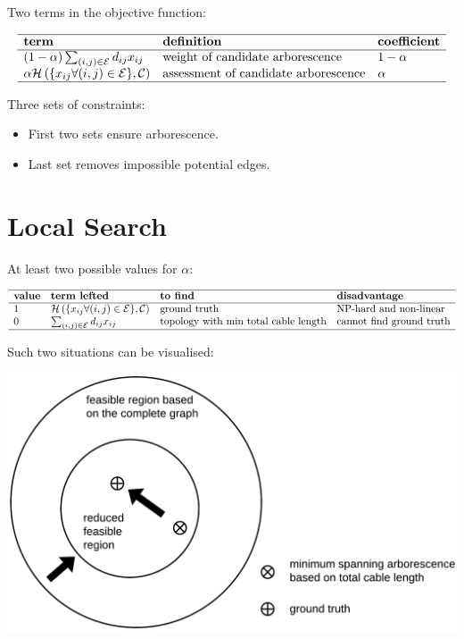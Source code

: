 \documentclass[
]{book}
\providecommand{\tightlist}{%
  \setlength{\itemsep}{0pt}\setlength{\parskip}{0pt}}
\begin{document}
Two terms in the objective function:

\[
\begin{array}{lll}
  \hline
  \textbf{term} & \textbf{definition} & \textbf{coefficient} \\
  \hline
  (1 - \alpha) \sum_{(i, j) \in \mathcal{E}} d_{i j} x_{i j}
  & \text{weight of candidate arborescence}
  & 1 - \alpha \\
  \alpha \mathcal{H}
  \left(\{x_{i j} \forall (i, j) \in \mathcal{E} \}, \mathcal{C} \right)
  & \text{assessment of candidate arborescence}
  & \alpha \\
  \hline
\end{array}
\]

Three sets of constraints:

\begin{itemize}
\tightlist
\item
  First two sets ensure arborescence. \citep{fischetti1997branch}
\item
  Last set removes impossible potential edges.
\end{itemize}

\hypertarget{combinatorial}{%
\section{Local Search}\label{combinatorial}}

At least two possible values for \(\alpha\):

\[
\begin{array}{llll}
  \hline
  \textbf{value} & \textbf{term lefted} & \textbf{to find}
  & \textbf{disadvantage} \\
  \hline
  1
  & \mathcal{H}
  \left(\{x_{i j} \forall (i, j) \in \mathcal{E} \}, \mathcal{C} \right)
  & \text{ground truth}
  & \text{NP-hard and non-linear} \\
  0
  & \sum_{(i, j) \in \mathcal{E}} d_{i j} x_{i j}
  & \text{topology with min total cable length}
  & \text{cannot find ground truth} \\
  \hline
\end{array}
\]

Such two situations can be visualised:

\begin{center}\includegraphics[width=0.7\linewidth]{Pictures/figFeasibleRegion} \end{center}
\end{document}
